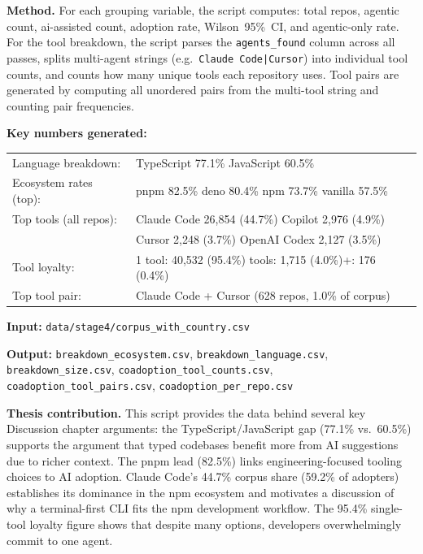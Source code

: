 \documentclass[11pt,a4paper]{article}
\begin{document}
\textbf{Method.}
For each grouping variable, the script computes: total repos, agentic count,
ai-assisted count, adoption rate, Wilson~95\%~CI, and agentic-only rate.
For the tool breakdown, the script parses the \texttt{agents\_found} column
across all passes, splits multi-agent strings (e.g.\ \texttt{Claude Code|Cursor})
into individual tool counts, and counts how many unique tools each repository uses.
Tool pairs are generated by computing all unordered pairs from the multi-tool
string and counting pair frequencies.

\begin{numbersbox}
\textbf{Key numbers generated:}\\[2pt]
\begin{tabular}{@{}ll@{}}
Language breakdown: & TypeScript 77.1\% \quad JavaScript 60.5\% \\[2pt]
Ecosystem rates (top): & pnpm 82.5\% \quad deno 80.4\% \quad npm 73.7\% \quad vanilla 57.5\% \\[2pt]
Top tools (all repos): & Claude Code 26,854 (44.7\%) \quad Copilot 2,976 (4.9\%) \\
                       & Cursor 2,248 (3.7\%) \quad OpenAI Codex 2,127 (3.5\%) \\[2pt]
Tool loyalty:          & 1 tool: 40,532 (95.4\%)\quad 2 tools: 1,715 (4.0\%)\quad 3+: 176 (0.4\%) \\[2pt]
Top tool pair:         & Claude Code + Cursor (628 repos, 1.0\% of corpus) \\
\end{tabular}
\end{numbersbox}

\textbf{Input:} \texttt{data/stage4/corpus\_with\_country.csv}

\textbf{Output:} \texttt{breakdown\_ecosystem.csv}, \texttt{breakdown\_language.csv},
\texttt{breakdown\_size.csv}, \texttt{coadoption\_tool\_counts.csv},
\texttt{coadoption\_tool\_pairs.csv}, \texttt{coadoption\_per\_repo.csv}

\begin{outputbox}
\textbf{Thesis contribution.}
This script provides the data behind several key Discussion chapter arguments:
the TypeScript/JavaScript gap (77.1\% vs.\ 60.5\%) supports the argument
that typed codebases benefit more from AI suggestions due to richer context.
The pnpm lead (82.5\%) links engineering-focused tooling choices to AI adoption.
Claude Code's 44.7\% corpus share (59.2\% of adopters) establishes its
dominance in the npm ecosystem and motivates a discussion of why a
terminal-first CLI fits the npm development workflow. The 95.4\% single-tool
loyalty figure shows that despite many options, developers overwhelmingly
commit to one agent.
\end{outputbox}
\end{document}
